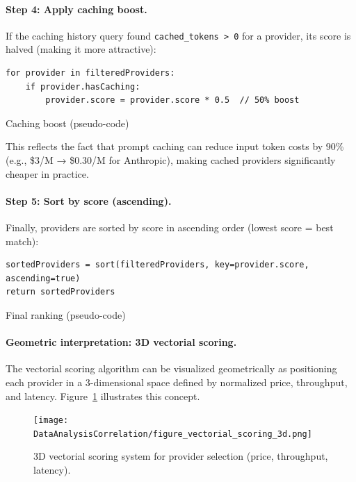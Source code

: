 \documentclass[english]{article}
\begin{document}
\paragraph{Step 4: Apply caching boost.}

If the caching history query found \texttt{cached\_tokens > 0} for a provider, its score is halved (making it more attractive):

\begin{listing}[H]
\begin{verbatim}
for provider in filteredProviders:
    if provider.hasCaching:
        provider.score = provider.score * 0.5  // 50% boost
\end{verbatim}
\caption{Caching boost (pseudo-code)}
\end{listing}

This reflects the fact that prompt caching can reduce input token costs by 90\% (e.g., \$3/M → \$0.30/M for Anthropic), making cached providers significantly cheaper in practice.

\paragraph{Step 5: Sort by score (ascending).}

Finally, providers are sorted by score in ascending order (lowest score = best match):

\begin{listing}[H]
\begin{verbatim}
sortedProviders = sort(filteredProviders, key=provider.score, ascending=true)
return sortedProviders
\end{verbatim}
\caption{Final ranking (pseudo-code)}
\end{listing}

\paragraph{Geometric interpretation: 3D vectorial scoring.}

The vectorial scoring algorithm can be visualized geometrically as positioning each provider in a 3-dimensional space defined by normalized price, throughput, and latency. Figure~\ref{fig:vectorial_scoring_3d} illustrates this concept.

\begin{figure}[H]
\centering
\texttt{[image: DataAnalysisCorrelation/figure\_vectorial\_scoring\_3d.png]}
\caption{3D vectorial scoring system for provider selection (price, throughput, latency).}
\label{fig:vectorial_scoring_3d}
\end{figure}
\end{document}
